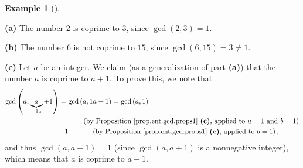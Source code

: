 \documentclass[numbers=enddot,12pt,final,onecolumn,notitlepage]{scrartcl}%
\numberwithin{exer}{subsection}
\theoremstyle{definition}
\newtheorem{exam}[theo]{Example}
\newenvironment{example}[1][]
{\begin{exam}[#1]\begin{leftbar}}
{\end{leftbar}\end{exam}}
\begin{document}
\begin{example}
\label{exa.ent.coprime.1}\textbf{(a)} The number $2$ is coprime to $3$, since
$\gcd\left(  2,3\right)  =1$.

\textbf{(b)} The number $6$ is not coprime to $15$, since $\gcd\left(
6,15\right)  =3\neq1$.

\textbf{(c)} Let $a$ be an integer. We claim (as a generalization of part
\textbf{(a)}) that the number $a$ is coprime to $a+1$. To prove this, we note
that%
\begin{align*}
\gcd\left(  a,\underbrace{a}_{=1a}+1\right)   &  =\gcd\left(  a,1a+1\right)
=\gcd\left(  a,1\right) \\
&  \ \ \ \ \ \ \ \ \ \ \left(  \text{by Proposition \ref{prop.ent.gcd.props1}
\textbf{(c)}, applied to }u=1\text{ and }b=1\right) \\
&  \mid1\ \ \ \ \ \ \ \ \ \ \left(  \text{by Proposition
\ref{prop.ent.gcd.props1} \textbf{(e)}, applied to }b=1\right)  ,
\end{align*}
and thus $\gcd\left(  a,a+1\right)  =1$ (since $\gcd\left(  a,a+1\right)  $ is
a nonnegative integer), which means that $a$ is coprime to $a+1$.


\end{example}
\end{document}
